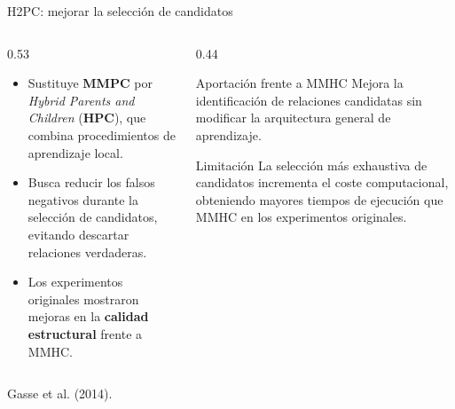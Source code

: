 \documentclass[aspectratio=169,11pt]{beamer}
\begin{document}
\begin{frame}[t]{H2PC: mejorar la selección de candidatos}
  \begin{columns}[T,onlytextwidth]

    \begin{column}{0.53\textwidth}
      \begin{itemize}

        \item Sustituye \textbf{MMPC} por
        \textit{Hybrid Parents and Children}
        (\textbf{HPC}), que combina
        procedimientos de aprendizaje local.

        \item Busca reducir los
        \alert{falsos negativos} durante la
        selección de candidatos, evitando
        descartar relaciones verdaderas.

        \item Los experimentos originales
        mostraron mejoras en la
        \textbf{calidad estructural}
        frente a MMHC.
      \end{itemize}
    \end{column}

    \begin{column}{0.44\textwidth}

      \begin{exampleblock}{Aportación frente a MMHC}
        Mejora la identificación de relaciones
        candidatas sin modificar la arquitectura
        general de aprendizaje.
      \end{exampleblock}

      \begin{alertblock}{Limitación}
        La selección más exhaustiva de candidatos
        incrementa el coste computacional,
        obteniendo mayores tiempos de ejecución
        que MMHC en los experimentos originales.
      \end{alertblock}

    \end{column}
  \end{columns}

  {\scriptsize\color{upmgray}Gasse et al. (2014).}
\end{frame}
\end{document}
